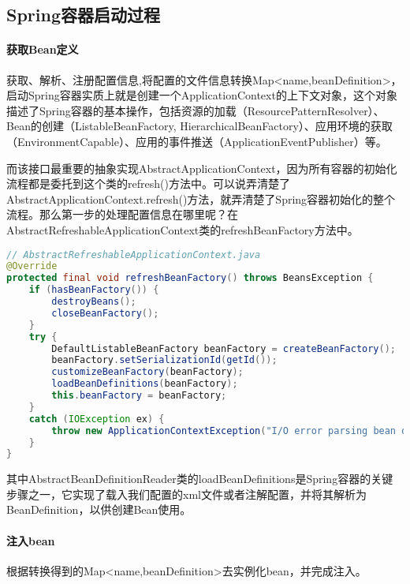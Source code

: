 \documentclass[../../../interview-questions.tex]{subfiles}
\begin{document}
\subsection{Spring容器启动过程}

\paragraph{获取Bean定义}

获取、解析、注册配置信息,将配置的文件信息转换Map<name,beanDefinition>，启动Spring容器实质上就是创建一个ApplicationContext的上下文对象，这个对象描述了Spring容器的基本操作，包括资源的加载（ResourcePatternResolver）、Bean的创建（ListableBeanFactory, HierarchicalBeanFactory）、应用环境的获取（EnvironmentCapable）、应用的事件推送（ApplicationEventPublisher）等。

而该接口最重要的抽象实现AbstractApplicationContext，因为所有容器的初始化流程都是委托到这个类的refresh()方法中。可以说弄清楚了AbstractApplicationContext.refresh()方法，就弄清楚了Spring容器初始化的整个流程。那么第一步的处理配置信息在哪里呢？在AbstractRefreshableApplicationContext类的refreshBeanFactory方法中。

\begin{lstlisting}[language=Java]
// AbstractRefreshableApplicationContext.java
@Override
protected final void refreshBeanFactory() throws BeansException {
    if (hasBeanFactory()) {
        destroyBeans();
        closeBeanFactory();
    }
    try {
        DefaultListableBeanFactory beanFactory = createBeanFactory();
        beanFactory.setSerializationId(getId());
        customizeBeanFactory(beanFactory);
        loadBeanDefinitions(beanFactory);
        this.beanFactory = beanFactory;
    }
    catch (IOException ex) {
        throw new ApplicationContextException("I/O error parsing bean definition source for " + getDisplayName(), ex);
    }
}    
\end{lstlisting}

其中AbstractBeanDefinitionReader类的loadBeanDefinitions是Spring容器的关键步骤之一，它实现了载入我们配置的xml文件或者注解配置，并将其解析为BeanDefinition，以供创建Bean使用。

\paragraph{注入bean}

根据转换得到的Map<name,beanDefinition>去实例化bean，并完成注入。
\end{document}
